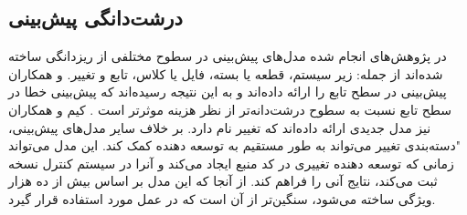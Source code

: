 \subsection{درشت‌دانگی پیش‌بینی }
در پژوهش‌های انجام شده مدل‌های پیش‌بینی در سطوح مختلفی از ریزدانگی ساخته شده‌اند از جمله: زیر سیستم، قطعه یا بسته، فایل یا کلاس، تابع و تغییر.  و همکاران  پیش‌بینی در سطح تابع را ارائه داده‌اند و به این نتیجه رسیده‌اند که پیش‌بینی خطا در سطح تابع نسبت به سطوح درشت‌دانه‌تر از نظر هزینه موثرتر است \cite{hata2012bug}. کیم و همکاران نیز مدل جدیدی ارائه داده‌اند که   تغییر نام دارد. بر خلاف سایر مدل‌های پیش‌بینی، "دسته‌بندی تغییر می‌تواند به طور مستقیم به توسعه دهنده کمک کند. این مدل می‌تواند زمانی که توسعه دهنده تغییری در کد منبع ایجاد می‌کند و آنرا در سیستم کنترل نسخه ثبت می‌کند، نتایج آنی را فراهم کند.  از آنجا که این مدل بر اساس بیش از ده هزار ویژگی ساخته می‌شود، سنگین‌تر از آن است که در عمل مورد استفاده قرار گیرد\cite{kim2008classifying}. \\


